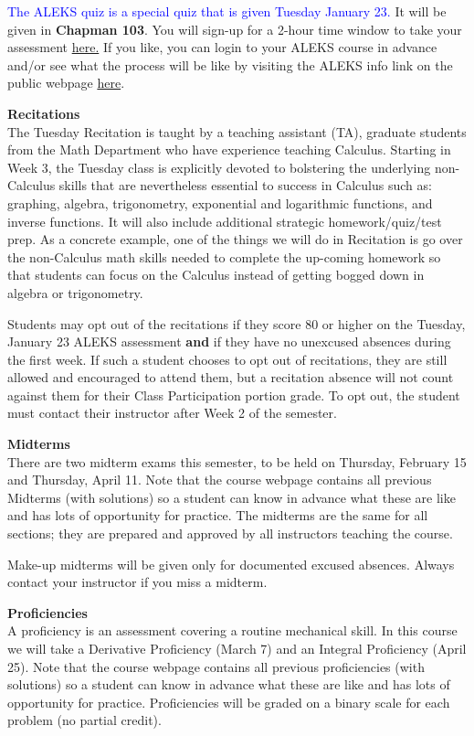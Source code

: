 \documentclass[12pt]{article}
\renewcommand{\emph}[1]{\textsf{\textbf{#1}}}
\newcommand{\localhead}[1]{\par\smallskip\textbf{#1}\nobreak\\}%
\def\heading#1{\localhead{\large\emph{#1}}}
\begin{document}
\textcolor{blue}{The ALEKS quiz is a special quiz that is given Tuesday January 23.} It will be given in \emph{Chapman 103}. You will sign-up for a 2-hour time window to take your assessment \href{https://aleks-testing.youcanbook.me/}{here.} If you like, you can login to your ALEKS course in advance and/or see what the process will be like by visiting the ALEKS info link on the public webpage \href{https://uaf-math251.github.io/week1-ALEKS.html}{here}.

\heading{Recitations}
The Tuesday Recitation is taught by a teaching assistant (TA), graduate students from the Math  Department who have experience teaching Calculus. Starting in Week 3, the Tuesday class is explicitly devoted to bolstering the underlying non-Calculus skills that are nevertheless essential to success in Calculus such as: graphing, algebra, trigonometry, exponential and logarithmic functions, and inverse functions. It will also include additional strategic homework/quiz/test prep. As a concrete example, one of the things we will do in Recitation is go over the non-Calculus math skills needed to complete the up-coming homework so that students can focus on the Calculus instead of getting bogged down in algebra or trigonometry.

Students may opt out of the recitations if they score 80 or higher on the Tuesday, January 23 ALEKS assessment \textbf{and} if they have no unexcused absences during the first week. If such a student chooses to opt out of recitations, they are still allowed and encouraged to attend them, but a recitation absence will not count against them for their Class Participation portion grade. To opt out, the student must contact their instructor after Week 2 of the semester.

\heading{Midterms}
There are two midterm exams this semester, to be held on Thursday, February 15 and Thursday, April 11. Note that the course webpage contains all previous Midterms (with solutions) so a student can know in advance what these are like and has lots of opportunity for practice. The midterms are the same 
for all sections; they are prepared and approved by all instructors teaching the course. 

Make-up midterms will be given only for documented excused absences. Always contact your instructor if you miss a midterm.

\pagebreak

\heading{Proficiencies}
A proficiency is an assessment covering a routine mechanical skill.  In this course we will take a Derivative Proficiency (March 7) and an Integral Proficiency (April 25). Note that the course webpage contains all previous proficiencies (with solutions) so a student can know in advance what these are like and has lots of opportunity for practice. Proficiencies will be graded on a binary scale for each problem (no partial credit).  
\end{document}
